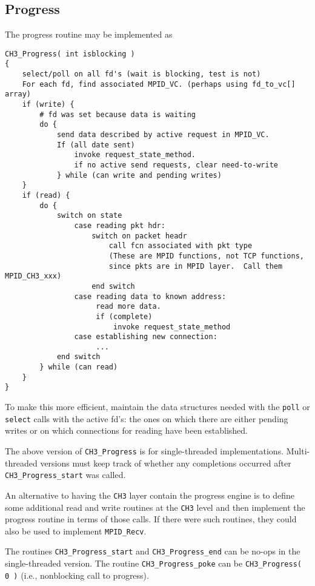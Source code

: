 \documentclass{article}
\def\code{\begingroup\makeustext\eatcode}
\def\eatcode#1{\texttt{#1}\endgroup}
\begin{document}
\subsection{Progress}
The progress routine may be implemented as
\begin{verbatim}
CH3_Progress( int isblocking )
{
    select/poll on all fd's (wait is blocking, test is not)
    For each fd, find associated MPID_VC. (perhaps using fd_to_vc[] array)
    if (write) {
        # fd was set because data is waiting
        do {
            send data described by active request in MPID_VC.  
            If (all date sent)
                invoke request_state_method.
                if no active send requests, clear need-to-write
            } while (can write and pending writes)
    }
    if (read) {
        do {
            switch on state
                case reading pkt hdr: 
                    switch on packet headr
                        call fcn associated with pkt type
                        (These are MPID functions, not TCP functions, 
                        since pkts are in MPID layer.  Call them MPID_CH3_xxx) 
                    end switch
                case reading data to known address:
                     read more data.
                     if (complete)
                         invoke request_state_method
                case establishing new connection:
                     ...
            end switch
        } while (can read)
    }
}
\end{verbatim}
To make this more efficient, maintain the data structures needed with the
\code{poll} or \code{select} calls with the active fd's: the ones on which
there are either pending writes or on which connections for reading have been
established.  

The above version of \code{CH3_Progress} is for single-threaded
implementations.  Multi-threaded versions must keep track of whether any
completions occurred after \code{CH3_Progress_start} was called.

An alternative to having the \code{CH3} layer contain the progress engine is
to define some additional read and write routines at the \code{CH3} level and
then implement the progress routine in terms of those calls.  If there were
such routines, they could also be used to implement \code{MPID_Recv}.  

The routines \code{CH3_Progress_start} and \code{CH3_Progress_end} can be
no-ops in the single-threaded version.  The routine \code{CH3_Progress_poke}
can be \code{CH3_Progress( 0 )} (i.e., nonblocking call to progress).
\end{document}
